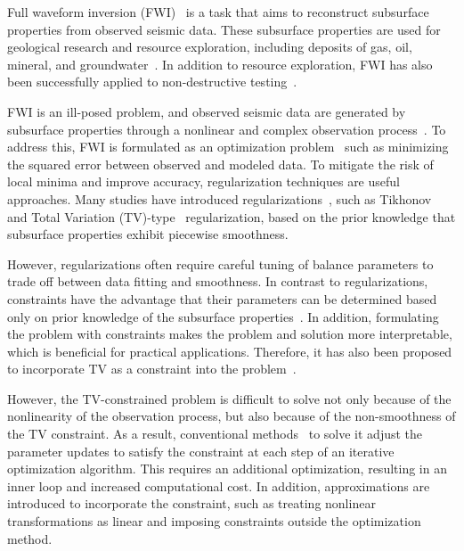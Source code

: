 Full waveform inversion (FWI)~\cite{FWI0,FWI1} is a task that aims to reconstruct subsurface properties from observed seismic data.
These subsurface properties are used for geological research and resource exploration, including deposits of gas, oil, mineral, and groundwater~\cite{FWI1,FWIApplicationGroundwater0,FWIApplicationGroundwater1}.
In addition to resource exploration, FWI has also been successfully applied to non-destructive testing~\cite{FWIApplicationNonDestructiveTesting0,FWIApplicationNonDestructiveTesting1}.

FWI is an ill-posed problem, and observed seismic data are generated by subsurface properties through a nonlinear and complex observation process~\cite{FWI1}.
To address this, FWI is formulated as an optimization problem~\cite{FWI0,CustomFWI0,CustomFWI1,CustomFWI2,CustomFWI3,CustomFWI4,CustomFWI5} such as minimizing the squared error between observed and modeled data.
To mitigate the risk of local minima and improve accuracy, regularization techniques are useful approaches.
Many studies have introduced regularizations~\cite{FWI-with-tikhonov-regularization,FWI-with-TV-regularization,FWI-with-directional-TV-regularization,FWI-with-high-order-TV-regularization,FWI-with-TGV-regularization}, such as Tikhonov~\cite{tikhonov} and Total Variation (TV)-type~\cite{TV,TGV} regularization, based on the prior knowledge that subsurface properties exhibit piecewise smoothness.

However, regularizations often require careful tuning of balance parameters to trade off between data fitting and smoothness.
In contrast to regularizations, constraints have the advantage that their parameters can be determined based only on prior knowledge of the subsurface properties~\cite{constraints-vs-penalties-in-FWI}.
In addition, formulating the problem with constraints makes the problem and solution more interpretable, which is beneficial for practical applications.
Therefore, it has also been proposed to incorporate TV as a constraint into the problem~\cite{FWI-with-TV-constraint,FWI-with-TV-constraint2,FWI-with-TV-constraint3}.

However, the TV-constrained problem is difficult to solve not only because of the nonlinearity of the observation process, but also because of the non-smoothness of the TV constraint.
As a result, conventional methods~\cite{FWI-with-TV-constraint,FWI-with-TV-constraint2,FWI-with-TV-constraint3} to solve it adjust the parameter updates to satisfy the constraint at each step of an iterative optimization algorithm.
This requires an additional optimization, resulting in an inner loop and increased computational cost.
In addition, approximations are introduced to incorporate the constraint, such as treating nonlinear transformations as linear and imposing constraints outside the optimization method.

